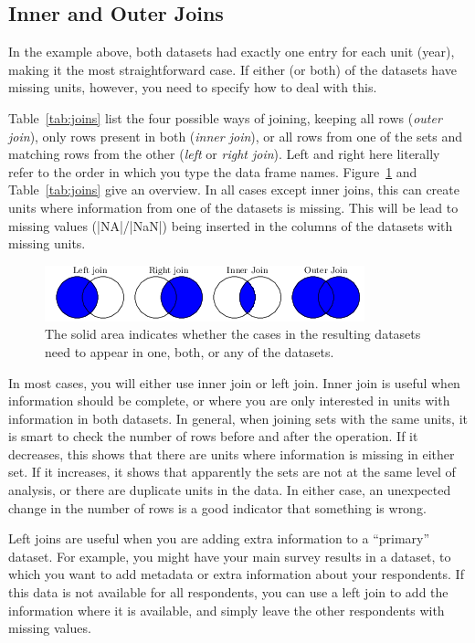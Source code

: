\subsection{Inner and Outer Joins}

In the example above, both datasets had exactly one entry for each unit (year), making it the most straightforward case.
If either (or both) of the datasets have missing units, however, you need to specify how to deal with this.

Table~\ref{tab:joins} list the four possible ways of joining, keeping all rows (\emph{outer join}), only rows present in both (\emph{inner join}), or all rows from one of the sets and matching rows from the other (\emph{left} or \emph{right join}). Left and right here literally refer to the order in which you type the data frame names. Figure~\ref{fig:joinvenn} and Table~\ref{tab:joins} give an overview.
In all cases except inner joins, this can create units where information from one of the datasets is missing.
This will be lead to missing values (|NA|/|NaN|) being inserted in the columns of the datasets with missing units.

\begin{figure}
    \centering
    \includegraphics{figures/ch07_figjoins.png}
    \caption{The solid area indicates whether the cases in the resulting datasets need to appear in one, both, or any of the datasets.}
    \label{fig:joinvenn}
\end{figure}



In most cases, you will either use inner join or left join.
Inner join is useful when information should be complete,
or where you are only interested in units with information in both datasets.
In general, when joining sets with the same units, it is smart to check the number of rows before and after the operation.
If it decreases, this shows that there are units where information is missing in either set.
If it increases, it shows that apparently the sets are not at the same level of analysis,
or there are duplicate units in the data.
In either case, an unexpected change in the number of rows is a good indicator that something is wrong.

Left joins are useful when you are adding extra information to a ``primary'' dataset.
For example, you might have your main survey results in a dataset,
to which you want to add metadata or extra information about your respondents.
If this data is not available for all respondents, you can use a left join to add the information
where it is available, and simply leave the other respondents with missing values.


